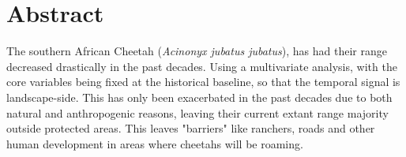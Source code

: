 \section*{Abstract}


%

\noindent

The southern African Cheetah (\textit{Acinonyx jubatus jubatus}), has had their range decreased drastically in the past decades. Using a multivariate analysis, with the core variables being fixed at the historical baseline, so that the temporal signal is landscape-side. This has only been exacerbated in the past decades due to both natural and anthropogenic reasons, leaving their current extant range majority outside protected areas. This leaves "barriers" like ranchers, roads and other human development in areas where cheetahs will be roaming.


